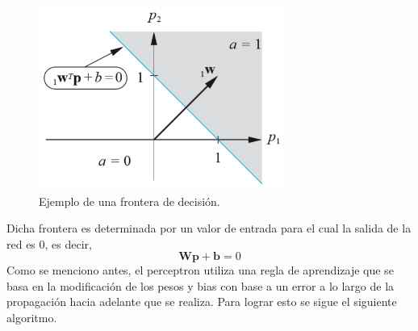 \documentclass[12pt, titlepage]{article}
\begin{document}
        \begin{figure}[H]
            \begin{center}
                \includegraphics[width=8cm]{img/perceptron/frontera.png}
                \caption{Ejemplo de una frontera de decisión. \cite{libro1}}
                \label{fig:frontera}
            \end{center}
        \end{figure}
        Dicha frontera es determinada por un valor de entrada para el cual la salida de la red es 0, es decir,
        \[\boldsymbol{Wp+b} = 0 \]
        Como se menciono antes, el perceptron utiliza una regla de aprendizaje que se basa en la modificación de los pesos y bias con base a un error a lo largo de la propagación hacia adelante que se realiza. 
        Para lograr esto se sigue el siguiente algoritmo.
\end{document}
